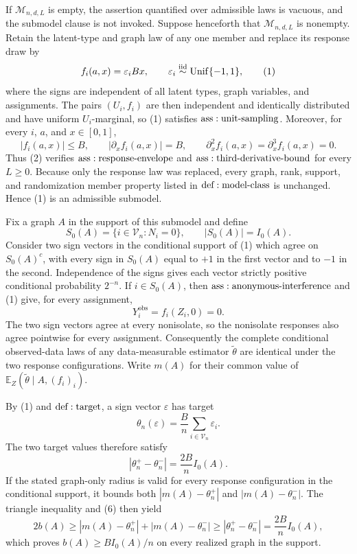 If \(\mathcal M_{n,d,L}\) is empty, the assertion quantified over admissible laws is vacuous, and the submodel clause is not invoked.  Suppose henceforth that \(\mathcal M_{n,d,L}\) is nonempty.  Retain the latent-type and graph law of any one member and replace its response draw by
\[
 f_i(a,x)=\varepsilon_i Bx,
 \qquad
 \varepsilon_i\mathrel{\overset{\mathrm{iid}}{\sim}}{\rm Unif}\{-1,1\},
 \tag{1}
\]
where the signs are independent of all latent types, graph variables, and assignments.  The pairs \((U_i,f_i)\) are then independent and identically distributed and have uniform \(U_i\)-marginal, so (1) satisfies \({\rm ass:unit\text{-}sampling}\).  Moreover, for every \(i\), \(a\), and \(x\in[0,1]\),
\[
 |f_i(a,x)|\le B,
 \qquad
 |\partial_x f_i(a,x)|=B,
 \qquad
 \partial_x^2 f_i(a,x)=\partial_x^3 f_i(a,x)=0.
 \tag{2}
\]
Thus (2) verifies \({\rm ass:response\text{-}envelope}\) and \({\rm ass:third\text{-}derivative\text{-}bound}\) for every \(L\ge0\).  Because only the response law was replaced, every graph, rank, support, and randomization member property listed in \({\rm def:model\text{-}class}\) is unchanged.  Hence (1) is an admissible submodel.

Fix a graph \(A\) in the support of this submodel and define
\[
 S_0(A)=\{i\in\mathcal V_n:N_i=0\},
 \qquad
 |S_0(A)|=I_0(A).
 \tag{3}
\]
Consider two sign vectors in the conditional support of (1) which agree on \(S_0(A)^c\), with every sign in \(S_0(A)\) equal to \(+1\) in the first vector and to \(-1\) in the second.  Independence of the signs gives each vector strictly positive conditional probability \(2^{-n}\).  If \(i\in S_0(A)\), then \({\rm ass:anonymous\text{-}interference}\) and (1) give, for every assignment,
\[
 Y_i^{\mathrm{obs}}=f_i(Z_i,0)=0.
 \tag{4}
\]
The two sign vectors agree at every nonisolate, so the nonisolate responses also agree pointwise for every assignment.  Consequently the complete conditional observed-data laws of any data-measurable estimator \(\widetilde\theta\) are identical under the two response configurations.  Write \(m(A)\) for their common value of \(\mathbb E_Z(\widetilde\theta\mid A,(f_i)_i)\).

By (1) and \({\rm def:target}\), a sign vector \(\varepsilon\) has target
\[
 \theta_n(\varepsilon)=\frac{B}{n}\sum_{i\in\mathcal V_n}\varepsilon_i.
 \tag{5}
\]
The two target values therefore satisfy
\[
 |\theta_n^+-\theta_n^-|=\frac{2B}{n}I_0(A).
 \tag{6}
\]
If the stated graph-only radius is valid for every response configuration in the conditional support, it bounds both \(|m(A)-\theta_n^+|\) and \(|m(A)-\theta_n^-|\).  The triangle inequality and (6) then yield
\[
 2b(A)
 \ge |m(A)-\theta_n^+|+|m(A)-\theta_n^-|
 \ge |\theta_n^+-\theta_n^-|
 =\frac{2B}{n}I_0(A),
 \tag{7}
\]
which proves \(b(A)\ge BI_0(A)/n\) on every realized graph in the support.

